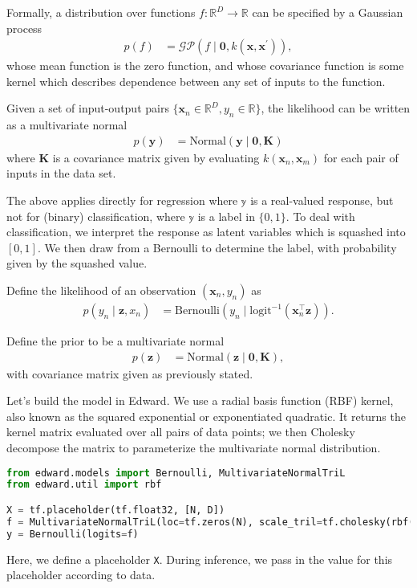 Formally, a distribution over functions $f:\mathbb{R}^D\to\mathbb{R}$ can be specified
by a Gaussian process
\begin{align*}
  p(f)
  &=
  \mathcal{GP}(f\mid \mathbf{0}, k(\mathbf{x}, \mathbf{x}^\prime)),
\end{align*}
whose mean function is the zero function, and whose covariance
function is some kernel which describes dependence between
any set of inputs to the function.

Given a set of input-output pairs
$\{\mathbf{x}_n\in\mathbb{R}^D,y_n\in\mathbb{R}\}$,
the likelihood can be written as a multivariate normal
\begin{align*}
  p(\mathbf{y})
  &=
  \text{Normal}(\mathbf{y} \mid \mathbf{0}, \mathbf{K})
\end{align*}
where $\mathbf{K}$ is a covariance matrix given by evaluating
$k(\mathbf{x}_n, \mathbf{x}_m)$ for each pair of inputs in the data
set.

The above applies directly for regression where $\mathbb{y}$ is a
real-valued response, but not for (binary) classification, where $\mathbb{y}$
is a label in $\{0,1\}$. To deal with classification, we interpret the
response as latent variables which is squashed into $[0,1]$. We then
draw from a Bernoulli to determine the label, with probability given
by the squashed value.

Define the likelihood of an observation $(\mathbf{x}_n, y_n)$ as
\begin{align*}
  p(y_n \mid \mathbf{z}, x_n)
  &=
  \text{Bernoulli}(y_n \mid \text{logit}^{-1}(\mathbf{x}_n^\top \mathbf{z})).
\end{align*}

Define the prior to be a multivariate normal
\begin{align*}
  p(\mathbf{z})
  &=
  \text{Normal}(\mathbf{z} \mid \mathbf{0}, \mathbf{K}),
\end{align*}
with covariance matrix given as previously stated.

Let's build the model in Edward. We use a radial basis function (RBF)
kernel, also known as the squared exponential or exponentiated
quadratic. It returns the kernel matrix evaluated over all pairs of
data points; we then Cholesky decompose the matrix to parameterize the
multivariate normal distribution.
\begin{lstlisting}[language=Python]
from edward.models import Bernoulli, MultivariateNormalTriL
from edward.util import rbf

X = tf.placeholder(tf.float32, [N, D])
f = MultivariateNormalTriL(loc=tf.zeros(N), scale_tril=tf.cholesky(rbf(X)))
y = Bernoulli(logits=f)
\end{lstlisting}
Here, we define a placeholder \texttt{X}. During inference, we pass in
the value for this placeholder according to data.

